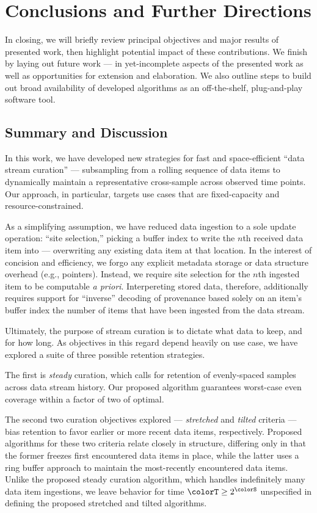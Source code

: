 \section{Conclusions and Further Directions} \label{sec:conclusion}

In closing, we will briefly review principal objectives and major results of presented work, then highlight potential impact of these contributions.
We finish by laying out future work --- in yet-incomplete aspects of the presented work as well as opportunities for extension and elaboration.
We also outline steps to build out broad availability of developed algorithms as an off-the-shelf, plug-and-play software tool.

\subsection{Summary and Discussion}

In this work, we have developed new strategies for fast and space-efficient ``data stream curation'' --- subsampling from a rolling sequence of data items to dynamically maintain a representative cross-sample across observed time points.
Our approach, in particular, targets use cases that are fixed-capacity and resource-constrained.

As a simplifying assumption, we have reduced data ingestion to a sole update operation: ``site selection,'' picking a buffer index to write the $n$th received data item into --- overwriting any existing data item at that location.
In the interest of concision and efficiency, we forgo any explicit metadata storage or data structure overhead (e.g., pointers).
Instead, we require site selection for the $n$th ingested item to be computable \textit{a priori}.
Interpereting stored data, therefore, additionally requires support for ``inverse'' decoding of provenance based solely on an item's buffer index the number of items that have been ingested from the data stream.

Ultimately, the purpose of stream curation is to dictate what data to keep, and for how long.
As objectives in this regard depend heavily on use case, we have explored a suite of three possible retention strategies.

The first is \textit{steady} curation, which calls for retention of evenly-spaced samples across data stream history.
Our proposed algorithm guarantees worst-case even coverage within a factor of two of optimal.

The second two curation objectives explored --- \textit{stretched} and \textit{tilted} criteria --- bias retention to favor earlier or more recent data items, respectively.
Proposed algorithms for these two criteria relate closely in structure, differing only in that the former freezes first encountered data items in place, while the latter uses a ring buffer approach to maintain the most-recently encountered data items.
Unlike the proposed steady curation algorithm, which handles indefinitely many data item ingestions, we leave behavior for time $\colorT \geq 2^{\colorS}$ unspecified in defining the proposed stretched and tilted algorithms.

